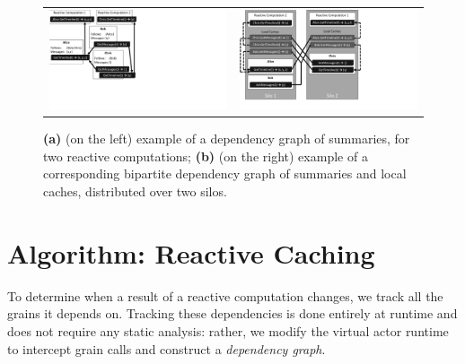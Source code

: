 
\begin{figure}
\centering
\begin{tabular}{cc}
\includegraphics[scale=.45, viewport=-1 164 480 540]{figs/summaries}
&
\includegraphics[scale=.4, viewport=-10 53 656 540]{figs/silos}\\
\end{tabular}
\caption{\textbf{(a)}  (on the left) example of a dependency graph of summaries, for two reactive computations; \textbf{(b)} (on the right) example of a corresponding bipartite dependency graph of summaries and local caches, distributed over two silos.}\label{fig:summaries}
\end{figure}

\section{Algorithm: Reactive Caching}

To determine when a result of a reactive computation changes, we track all the grains it depends on. Tracking these dependencies is done entirely at runtime and does not require any static analysis: rather, we modify the virtual actor runtime to intercept grain calls and construct a \emph{dependency graph}.

